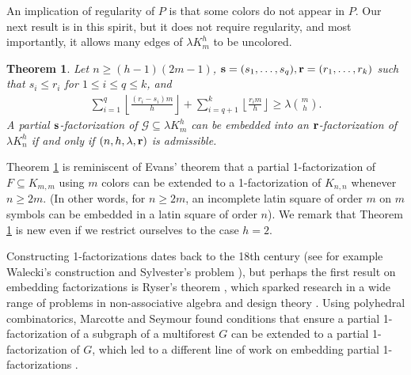 \documentclass[12pt,oneside]{amsart}
\newtheorem{theorem}{Theorem}[section]
\newcommand{\cc}{\mathcal}
\newcommand\rounddown[1]{\left\lfloor#1\right\rfloor}
\begin{document}
An implication of regularity of $P$ is that  some colors do not appear in $P$.  Our next result is in  this spirit, but it does not require regularity, and most importantly, it allows many edges of $\lambda K_m^h$ to be uncolored.
\begin{theorem} \label{incompembthm}
Let  $n \geq (h-1)(2m-1)$,  $\vb{s}=(s_1,\dots,s_q), \vb{r}=(r_1,\dots,r_k)$ such that $s_i\leq r_i$ for $1\leq i\leq q\leq k$, and 
\begin{align*} 
    \sum_{i=1}^q \rounddown{\frac{(r_i-s_i)m}{h}}+\sum_{i=q+1}^k \rounddown{\frac{r_im}{h}} \geq \lambda\binom{m}{h}.
\end{align*}
A partial $\vb{s}$-factorization of $\cc G\subseteq\lambda K_m^h$ can be embedded into an $\vb r$-factorization of $\lambda K_n^h$ if and only if $(n,h,\lambda, \vb r)$ is admissible.
\end{theorem} 
Theorem \ref{incompembthm} is  reminiscent  of Evans' theorem \cite{MR122728} that a partial 1-factorization of $F\subseteq K_{m,m}$ using $m$ colors can be extended to a 1-factorization of $K_{n,n}$ whenever $n\geq 2m$.
(In other words, for $n\geq 2m$, an incomplete latin square of order $m$ on $m$ symbols can be embedded in a latin square of order $n$). We remark that Theorem \ref{incompembthm} is new even if we restrict ourselves to the case $h=2$. 

Constructing 1-factorizations dates back to the  18th century (see for example Walecki's construction \cite{MR2394738}  and Sylvester's problem \cite{MR0416986}), but perhaps the first result on embedding factorizations is Ryser's theorem \cite{MR42361}, which sparked research in a wide range of problems in non-associative algebra and design theory \cite{MR1275861}. 
 Using  polyhedral combinatorics, Marcotte and Seymour \cite{MR1073098}  found  conditions that ensure a partial 1-factorization  of a subgraph of a  multiforest $G$ can be extended to  a partial 1-factorization of $G$, which led to a different line of work on embedding partial 1-factorizations \cite{MR4174122, MR4118383, MR1958148, MR3829287, MR4009303, MR3862954}. 
\end{document}
